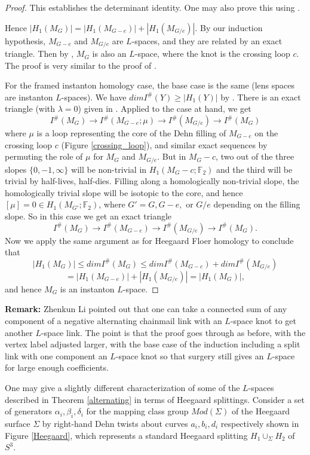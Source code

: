 \documentclass{amsart}
\theoremstyle{definition}
\theoremstyle{remark}
\begin{document}
\begin{proof}
This establishes the determinant identity. One may also prove this using \cite[Theorem 4.4]{arXiv:2110.13949}. 

Hence $|H_1(M_G)| = |H_1(M_{G-e})| + |H_1(M_{G/e})|$. By our induction hypothesis, $M_{G-e}$ and $M_{G/e}$ are $L$-spaces, and they are related by an exact triangle. Then by \cite[Proposition 2.1]{MR2168576}, $M_G$ is also an $L$-space, where the knot is the crossing loop $c$. The proof is very similar to the proof of \cite[Lemma 3.2, Proposition 3.3]{MR2141852}. 

For the framed instanton homology case, the base case is the same (lens spaces are instanton $L$-spaces). We have $dim I^\#(Y) \geq |H_1(Y)|$ by \cite[Corollary 1.4]{MR3394316}. There is an exact triangle (with $\lambda =0$) given in \cite[Section 7.5]{MR3394316}. Applied to the case at hand, we get 
$$I^\#(M_G)\to I^\#(M_{G-e};\mu) \to I^\#(M_{G/e}) \to I^\#(M_G)$$ where $\mu$ is a loop representing the core of the Dehn filling of $M_{G-e}$ on the crossing loop $c$ (Figure \ref{crossing_loop}), and similar exact sequences by permuting the role of $\mu$ for $M_G$ and $M_{G/e}$. But in $M_G-c$, two out of the three slopes $\{0, -1, \infty\}$ will be non-trivial in $H_1(M_G-c;\mathbb{F}_2)$ and the third will be trivial by half-lives, half-dies. Filling along a homologically non-trivial slope, the homologically trivial slope will be isotopic to the core, and hence $[\mu]=0\in H_1(M_{G'};\mathbb{F}_2)$, where $G'=G, G-e,$ or $G/e$ depending on the filling slope. So in this case we get an exact triangle 
$$I^\#(M_G)\to I^\#(M_{G-e}) \to I^\#(M_{G/e}) \to I^\#(M_G).$$
Now we apply the same argument as for Heegaard Floer homology to conclude that $$|H_1(M_G)|\leq dim I^\#(M_G) \leq dim I^\#(M_{G-e}) + dim I^\#(M_{G/e}) $$ $$= |H_1(M_{G-e})|+|H_1(M_{G/e})| =| H_1(M_G)|,$$ and hence $M_G$ is an instanton $L$-space. 
\end{proof}

{\bf Remark:} Zhenkun Li pointed out that one can take a connected sum of any component of a negative alternating chainmail link with an $L$-space knot to get another $L$-space link. The point is that the proof goes through as before, with the vertex label adjusted larger, with the base case of the induction including a split link with one component an $L$-space knot so that surgery still gives an $L$-space for large enough coefficients. 

One may give a slightly different characterization of some of the $L$-spaces described in Theorem \ref{alternating} in terms of Heegaard splittings. Consider a set of generators $\alpha_i, \beta_i,\delta_i$ for the mapping class group $Mod(\Sigma)$ of the Heegaard surface $\Sigma$ by right-hand Dehn twists about curves $a_i,b_i,d_i$ respectively shown in Figure \ref{Heegaard}, which represents a standard Heegaard splitting $H_1\cup_\Sigma H_2$ of $S^3$. 
\end{document}
